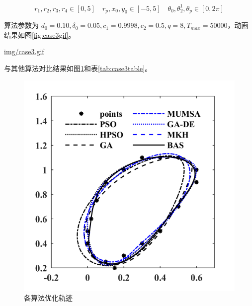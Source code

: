 \documentclass[]{ctexbook}
\theoremstyle{definition}
\theoremstyle{definition}
\theoremstyle{definition}
\theoremstyle{remark}
\begin{document}
\[
r_1,r_2,r_3,r_4\in[0,5]\quad r_p,x_0,y_0\in[-5,5]\quad \theta_0,\theta_2^1,\theta_p\in[0,2\pi]
\]

算法参数为
\(d_0 = 0.10,\delta_0=0.05,c_1=0.9998,c_2=0.5,q=8,T_{max}=50000\)，动画结果如图\ref{fig:case3gif}。

\url{img/case3.gif}

与其他算法对比结果如图\ref{fig:case3png}和表\ref{tab:case3table}。

\begin{figure}

{\centering \includegraphics[width=0.5\linewidth]{img/case3png} 

}

\caption{各算法优化轨迹}\label{fig:case3png}
\end{figure}
\end{document}
